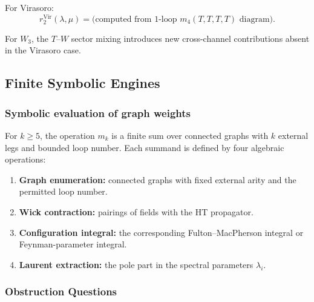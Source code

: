 For Virasoro:
\begin{equation}
r_2^{\text{Vir}}(\lambda,\mu) = \text{(computed from 1-loop } m_4(T,T,T,T) \text{ diagram)}.
\end{equation}

For $W_3$, the $T$--$W$ sector mixing introduces new cross-channel contributions absent in the Virasoro case.

\subsection{Finite Symbolic Engines}

\subsubsection{Symbolic evaluation of graph weights}

For $k\geq5$, the operation $m_k$ is a finite sum over connected
graphs with $k$ external legs and bounded loop number. Each summand is
defined by four algebraic operations:
\begin{enumerate}
\item \textbf{Graph enumeration:} connected graphs with fixed external
arity and the permitted loop number.
\item \textbf{Wick contraction:} pairings of fields with the HT
propagator.
\item \textbf{Configuration integral:} the corresponding
Fulton--MacPherson integral or Feynman-parameter integral.
\item \textbf{Laurent extraction:} the pole part in the spectral
parameters $\lambda_i$.
\end{enumerate}

\subsubsection{Obstruction Questions}

